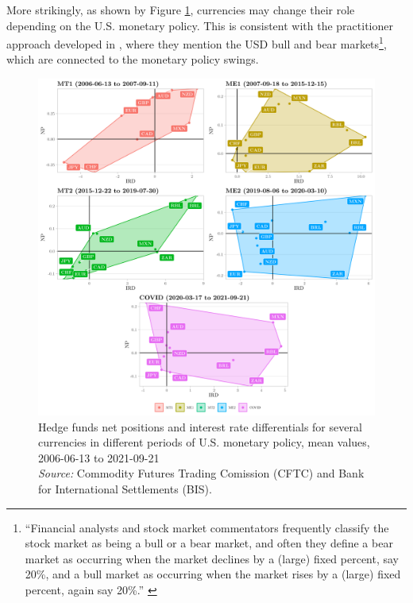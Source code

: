 \documentclass[a4paper, twoside]{templates/ociamthesis}
\begin{document}
More strikingly, as shown by Figure \ref{fig:Figure313}, currencies may change their role depending on the U.S. monetary policy. This is consistent with the practitioner approach developed in \textcite[Chpater 4.3,  62-68]{willer2020}, where they mention the USD bull and bear markets\footnote{``Financial analysts and stock market commentators frequently classify the stock market as being a bull or a bear market, and often they define a bear market as occurring when the market declines by a (large) fixed percent, say 20\%, and a bull market as occurring when the market rises by a (large) fixed percent, again say 20\%.'' \autocite[ 983]{jansen2010}}, which are connected to the monetary policy swings.

\begin{figure}[!ht]

{\centering \includegraphics[width=0.99\columnwidth]{figure/TOG_HF} 

}

\caption[Hedge funds net positions and interest rate differentials for several currencies in different periods of U.S. monetary policy, mean values, 2006-06-13 to 2021-09-21]{Hedge funds net positions and interest rate differentials for several currencies in different periods of U.S. monetary policy, mean values, 2006-06-13 to 2021-09-21 \\ \scriptsize \textit{Source:} Commodity Futures Trading Comission (CFTC) and Bank for International Settlements (BIS).}\label{fig:Figure313}
\end{figure}
\end{document}
